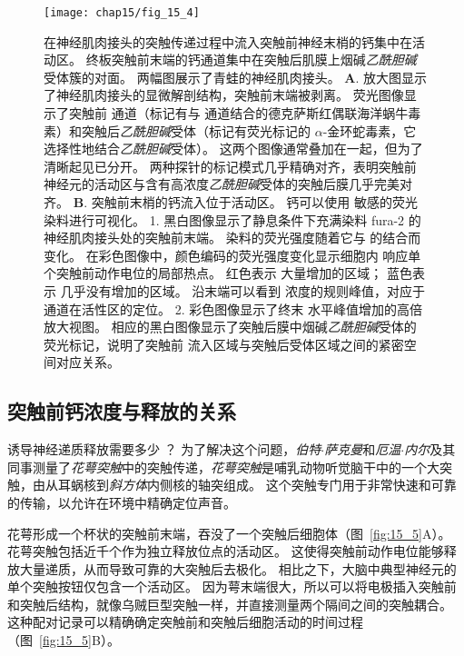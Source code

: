 \begin{figure}[htbp]
	\centering
	\texttt{[image: chap15/fig\_15\_4]}
	\caption{在神经肌肉接头的突触传递过程中流入突触前神经末梢的钙集中在活动区。
	终板突触前末端的钙通道集中在突触后肌膜上烟碱\textit{乙酰胆碱}受体簇的对面。
	两幅图展示了青蛙的神经肌肉接头。
	\textbf{A}. 放大图显示了神经肌肉接头的显微解剖结构，突触前末端被剥离。
	荧光图像显示了突触前  通道（标记有与  通道结合的德克萨斯红偶联海洋蜗牛毒素）和突触后\textit{乙酰胆碱}受体（标记有荧光标记的 $\alpha$-金环蛇毒素，它选择性地结合\textit{乙酰胆碱}受体）。
	这两个图像通常叠加在一起，但为了清晰起见已分开。
	两种探针的标记模式几乎精确对齐，表明突触前神经元的活动区与含有高浓度\textit{乙酰胆碱}受体的突触后膜几乎完美对齐\cite{robitaille1990strategic}。
	\textbf{B}. 突触前末梢的钙流入位于活动区。
	钙可以使用  敏感的荧光染料进行可视化。
	1. 黑白图像显示了静息条件下充满染料 fura-2 的神经肌肉接头处的突触前末端。
	染料的荧光强度随着它与  的结合而变化。
	在彩色图像中，颜色编码的荧光强度变化显示细胞内  响应单个突触前动作电位的局部热点。
	红色表示  大量增加的区域；
	蓝色表示  几乎没有增加的区域。
	沿末端可以看到  浓度的规则峰值，对应于  通道在活性区的定位。
	2. 彩色图像显示了终末  水平峰值增加的高倍放大视图。
	相应的黑白图像显示了突触后膜中烟碱\textit{乙酰胆碱}受体的荧光标记，说明了突触前  流入区域与突触后受体区域之间的紧密空间对应关系\cite{wachman2004spatial}。}
	\label{fig:15_4}
\end{figure}



\subsection{突触前钙浓度与释放的关系}

诱导神经递质释放需要多少 ？ 
为了解决这个问题，\textit{伯特$\cdot$萨克曼}和\textit{厄温$\cdot$内尔}及其同事测量了\textit{花萼突触}中的突触传递，\textit{花萼突触}是哺乳动物听觉脑干中的一个大突触，由从耳蜗核到\textit{斜方体}内侧核的轴突组成。
这个突触专门用于非常快速和可靠的传输，以允许在环境中精确定位声音。


花萼形成一个杯状的突触前末端，吞没了一个突触后细胞体（图~\ref{fig:15_5}A）。
花萼突触包括近千个作为独立释放位点的活动区。
这使得突触前动作电位能够释放大量递质，从而导致可靠的大突触后去极化。
相比之下，大脑中典型神经元的单个突触按钮仅包含一个活动区。
因为萼末端很大，所以可以将电极插入突触前和突触后结构，就像乌贼巨型突触一样，并直接测量两个隔间之间的突触耦合。
这种配对记录可以精确确定突触前和突触后细胞活动的时间过程（图~\ref{fig:15_5}B）。



